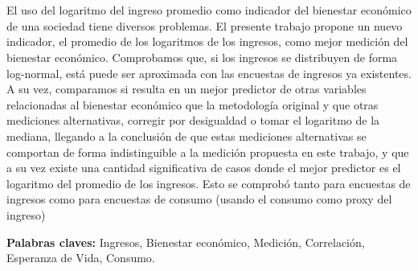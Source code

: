 \chapter*{\runtitulo}

El uso del logaritmo del ingreso promedio como indicador del bienestar económico de una sociedad tiene diversos problemas. El presente trabajo propone un nuevo indicador, el promedio de los logaritmos de los ingresos, como mejor medición del bienestar económico. Comprobamos que, si los ingresos se distribuyen de forma log-normal, está puede ser aproximada con las encuestas de ingresos ya existentes. A su vez, comparamos si resulta en un mejor predictor de otras variables relacionadas al bienestar económico que la metodología original y que otras mediciones alternativas, corregir por desigualdad o tomar el logaritmo de la mediana, llegando a la conclusión de que estas mediciones alternativas se comportan de forma indistinguible a la medición propuesta en este trabajo, y que a su vez existe una cantidad significativa de casos donde el mejor predictor es el logaritmo del promedio de los ingresos. Esto se comprobó tanto para encuestas de ingresos como para encuestas de consumo (usando el consumo como proxy del ingreso)

\bigskip


\noindent\textbf{Palabras claves:} Ingresos, Bienestar económico, Medición, Correlación, Esperanza de Vida, Consumo.